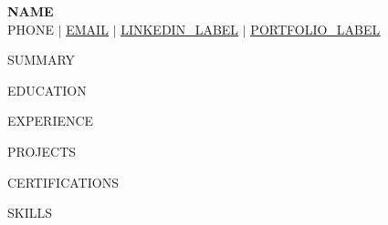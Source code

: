 \documentclass[letterpaper,11pt]{article}
\begin{document}
\begin{center}
    \textbf{\Huge \scshape {{NAME}}} \\ \vspace{1pt}
    \small {{PHONE}} $|$ \href{mailto:{{EMAIL}}}{\underline{{{EMAIL}}}} $|$
    \href{{{LINKEDIN_URL}}}{\underline{{{LINKEDIN_LABEL}}}} $|$
    \href{{{PORTFOLIO_URL}}}{\underline{{{PORTFOLIO_LABEL}}}}
\end{center}

{{SUMMARY}}

{{EDUCATION}}

{{EXPERIENCE}}

{{PROJECTS}}

{{CERTIFICATIONS}}

{{SKILLS}}

\end{document}
